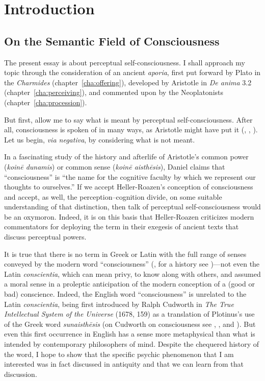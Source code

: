 \chapter{Introduction} %
\label{cha:introduction}

\section{On the Semantic Field of Consciousness} %
\label{sec:semantic_field}

The present essay is about perceptual self-consciousness. I shall approach my topic through the consideration of an ancient \emph{aporia}, first put forward by Plato in the \emph{Charmides} (chapter~\ref{cha:offering}), developed by Aristotle in \emph{De anima} 3.2 (chapter~\ref{cha:perceiving}), and commented upon by the Neoplatonists (chapter~\ref{cha:procession}).

But first, allow me to say what is meant by perceptual self-consciousness. After all, consciousness is spoken of in many ways, as Aristotle might have put it (\citealt[appendix 93–4]{Bain:1872nu}, \citealt[2.2.1]{Brentano:1874aa}, \citealt{lycan87}). Let us begin, \emph{via negativa}, by considering what is not meant.

In a fascinating study of the history and afterlife of Aristotle's common power (\emph{koinē dunamis}) or common sense (\emph{koinē aisthēsis}), Daniel \citet[21]{Heller-Roazen:2007ee} claims that ``consciousness'' is ``the name for the cognitive faculty by which we represent our thoughts to ourselves.'' If we accept Heller-Roazen's conception of consciousness and accept, as well, the perception–cognition divide, on some suitable understanding of that distinction, then talk of perceptual self-consciousness would be an oxymoron. Indeed, it is on this basis that Heller-Roazen criticizes modern commentators for deploying the term in their exegesis of ancient texts that discuss perceptual powers. 

It is true that there is no term in Greek or Latin with the full range of senses conveyed by the modern word ``consciousness'' (\citealt[21, 302 n2]{Heller-Roazen:2007ee}, for a history see \citealt[chapter 8]{Lewis:1960ga})—not even the Latin \emph{conscientia}, which can mean privy, to know along with others, and assumed a moral sense in a proleptic anticipation of the modern conception of a (good or bad) conscience. Indeed, the English word ``consciousness'' is unrelated to the Latin \emph{conscientia}, being first introduced by Ralph Cudworth in \emph{The True Intellectual System of the Universe} (1678, 159) as a translation of Plotinus's use of the Greek word \emph{sunaisthēsis} (on Cudworth on consciousness see \citealt{Thiel:1991hw}, \citealt[chapter 2]{Thiel:2011cq}, and \citealt{Leisinger:2022sh}). But even this first occurrence in English has a sense more metaphysical than what is intended by contemporary philosophers of mind. Despite the chequered history of the word, I hope to show that the specific psychic phenomenon that I am interested was in fact discussed in antiquity and that we can learn from that discussion.

